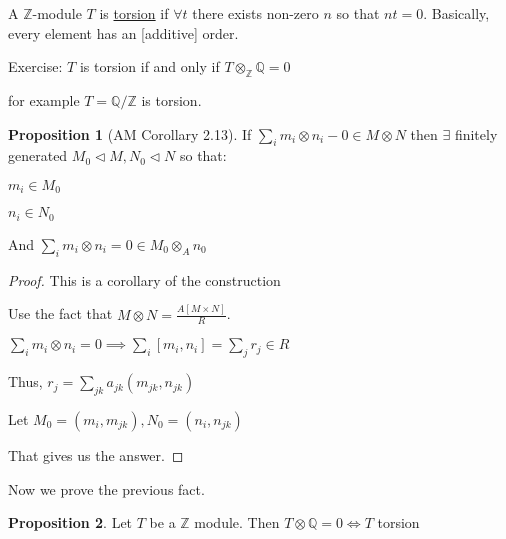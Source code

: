 \documentclass{article}
\theoremstyle{definition}
\newtheorem{proposition}{Proposition}
\begin{document}
A \(\mathbb{Z}\)-module \(T\) is \underline{torsion} if \(\forall t\) there exists non-zero \(n\) so that \(nt = 0\). Basically, every element has an [additive] order.

Exercise: \(T\) is torsion if and only if \(T \otimes_\mathbb{Z} \mathbb{Q} = 0\) 

for example \(T = \mathbb{Q} / \mathbb{Z}\) is torsion.

\begin{proposition}
    [AM Corollary 2.13]

    If \(\sum_{i} m_i \otimes n_i - 0 \in M \otimes N\) then \(\exists\) finitely generated \(M_0 \triangleleft M, N_0 \triangleleft N\) so that:

    \(m_i \in M_0\) 

    \(n_i \in N_0\) 

    And \(\sum_{i} m_i \otimes n_i = 0 \in M_0 \otimes _A n_0\) 
\end{proposition}

\begin{proof}
    This is a corollary of the construction

    Use the fact that \(M \otimes N = \frac{A[M \times N]}{R}\).

    \(\sum_{i} m_i \otimes n_i = 0 \implies \sum_{i} [m_i, n_i] = \sum_{j} r_j \in R\) 

    Thus, \(r_j = \sum_{jk} a_{jk}(m_{jk},n_{jk})\) 

    Let \(M_0 = (m_i, m_{jk}), N_0 = (n_i, n_{jk})\) 

    That gives us the answer.

\end{proof}

Now we prove the previous fact.

\begin{proposition}
    Let \(T\) be a \(\mathbb{Z}\) module. Then \(T \otimes \mathbb{Q} = 0 \iff T\) torsion
\end{proposition}
\end{document}
